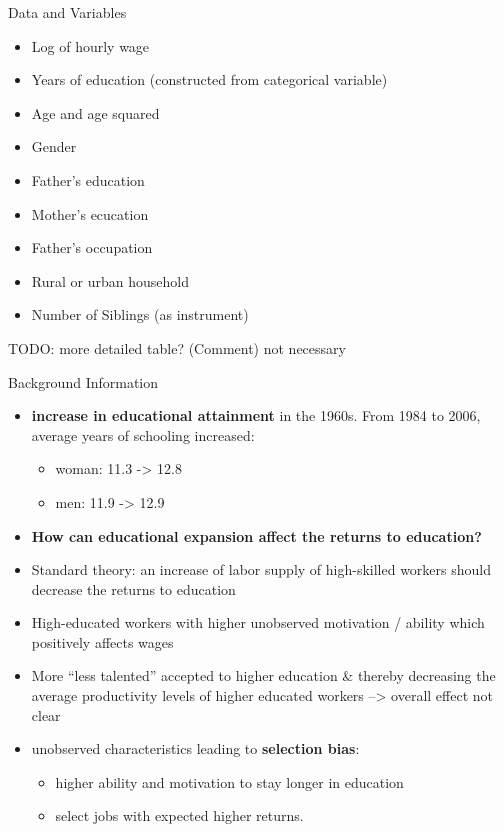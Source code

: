 \documentclass[10pt,ignorenonframetext,]{beamer}
\providecommand{\tightlist}{%
  \setlength{\itemsep}{0pt}\setlength{\parskip}{0pt}}
\begin{document}
\begin{frame}{Data and Variables}
\protect\hypertarget{data-and-variables}{}

\begin{itemize}
\tightlist
\item
  Log of hourly wage
\item
  Years of education (constructed from categorical variable)
\item
  Age and age squared
\item
  Gender
\item
  Father's education
\item
  Mother's ecucation
\item
  Father's occupation
\item
  Rural or urban household
\item
  Number of Siblings (as instrument)
\end{itemize}

TODO: more detailed table? (Comment) not necessary

\end{frame}

\begin{frame}{Background Information}
\protect\hypertarget{background-information}{}

\begin{itemize}
\item
  \textbf{increase in educational attainment} in the 1960s. From 1984 to
  2006, average years of schooling increased:

  \begin{itemize}
  \tightlist
  \item
    woman: 11.3 -\textgreater{} 12.8
  \item
    men: 11.9 -\textgreater{} 12.9
  \end{itemize}
\item
  \textbf{How can educational expansion affect the returns to
  education?}
\item
  Standard theory: an increase of labor supply of high-skilled workers
  should decrease the returns to education
\item
  High-educated workers with higher unobserved motivation / ability
  which positively affects wages
\item
  More ``less talented'' accepted to higher education \& thereby
  decreasing the average productivity levels of higher educated workers
  --\textgreater{} overall effect not clear
\item
  unobserved characteristics leading to \textbf{selection bias}:

  \begin{itemize}
  \tightlist
  \item
    higher ability and motivation to stay longer in education
  \item
    select jobs with expected higher returns.
  \end{itemize}
\end{itemize}

\end{frame}
\end{document}
